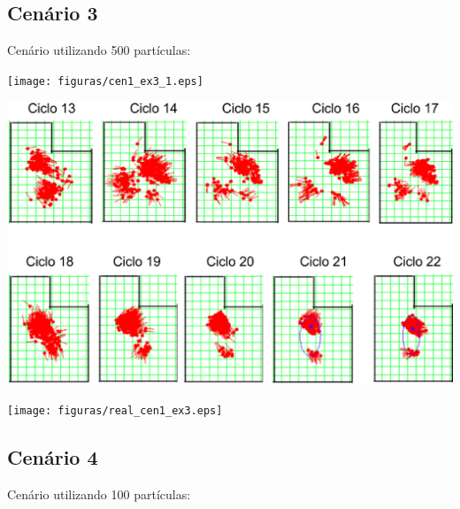 \subsection{Cenário 3}

Cenário utilizando 500 partículas:

{\centering
\texttt{[image: figuras/cen1\_ex3\_1.eps]}
\label{img:cen1_ex3_1}
\par}

{\centering
\includegraphics[scale=0.4]{figuras/cen1_ex3_2.eps}
\label{img:cen1_ex3_2}
\par}

{\centering
\texttt{[image: figuras/real\_cen1\_ex3.eps]}
\label{img:real_cen1_ex3}
\par}

\subsection{Cenário 4}

Cenário utilizando 100 partículas:

